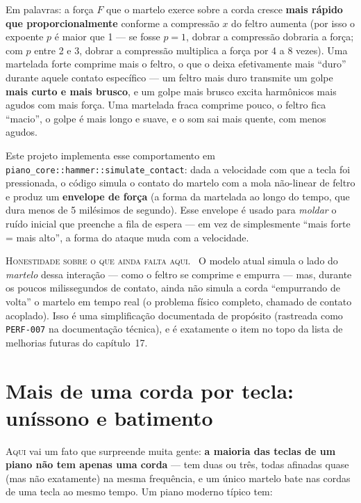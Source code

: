 \documentclass[11pt,oneside]{book}
\newcommand{\nova}[1]{\textsc{\color{accent}#1.}~}
\newcommand{\opening}[2]{\lettrine[lines=2,loversize=0.08,lraise=0.02]{#1}{#2}}
\begin{document}
Em palavras: a força $F$ que o martelo exerce sobre a corda cresce
\textbf{mais rápido que proporcionalmente} conforme a compressão $x$ do
feltro aumenta (por isso o expoente $p$ é maior que 1 --- se fosse $p=1$,
dobrar a compressão dobraria a força; com $p$ entre 2 e 3, dobrar a
compressão multiplica a força por 4 a 8 vezes). Uma martelada forte
comprime mais o feltro, o que o deixa efetivamente mais \enquote{duro}
durante aquele contato específico --- um feltro mais duro transmite um
golpe \textbf{mais curto e mais brusco}, e um golpe mais brusco excita
harmônicos mais agudos com mais força. Uma martelada fraca comprime pouco,
o feltro fica \enquote{macio}, o golpe é mais longo e suave, e o som sai
mais quente, com menos agudos.

Este projeto implementa esse comportamento em
\texttt{piano\_core::hammer::simulate\_contact}: dada a velocidade com que
a tecla foi pressionada, o código simula o contato do martelo com a mola
não-linear de feltro e produz um \textbf{envelope de força} (a forma da
martelada ao longo do tempo, que dura menos de 5 milésimos de segundo).
Esse envelope é usado para \emph{moldar} o ruído inicial que preenche a
fila de espera --- em vez de simplesmente \enquote{mais forte = mais
alto}, a forma do ataque muda com a velocidade.

\begin{newword}
\nova{Honestidade sobre o que ainda falta aqui} O modelo atual simula o
lado do \emph{martelo} dessa interação --- como o feltro se comprime e
empurra --- mas, durante os poucos milissegundos de contato, ainda não
simula a corda \enquote{empurrando de volta} o martelo em tempo real (o
problema físico completo, chamado de contato acoplado). Isso é uma
simplificação documentada de propósito (rastreada como \texttt{PERF-007}
na documentação técnica), e é exatamente o item no topo da lista de
melhorias futuras do capítulo~17.
\end{newword}

\chapter{Mais de uma corda por tecla: uníssono e batimento}

\opening{A}{qui} vai um fato que surpreende muita gente: \textbf{a maioria
das teclas de um piano não tem apenas uma corda} --- tem duas ou três,
todas afinadas quase (mas não exatamente) na mesma frequência, e um único
martelo bate nas cordas de uma tecla ao mesmo tempo. Um piano moderno
típico tem:
\end{document}
